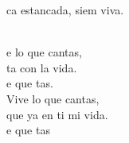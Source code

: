 \begin{cancion}
	ca estancada, siem viva. \\\jump\\
	\begin{chorus}%
	e lo que cantas, \\
	ta con la vida.\\
	e que tas.\\
Vive lo que cantas,\\
	que ya en ti mi vida.\\
	e que tas    \\
	\end{chorus}%
	\jump\\
\end{cancion}%
